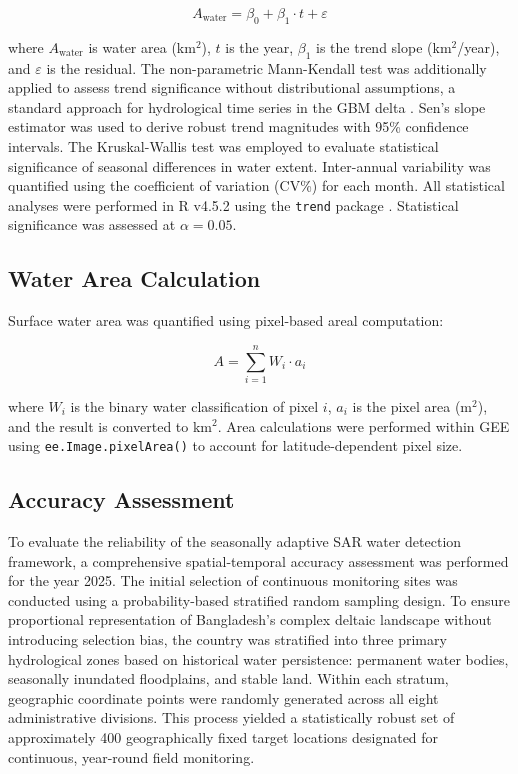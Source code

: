 \documentclass[fleqn,10pt]{article}
\begin{document}
\begin{equation}
A_{\text{water}} = \beta_0 + \beta_1 \cdot t + \varepsilon
\label{eq:trend}
\end{equation}

where $A_{\text{water}}$ is water area (km$^{2}$), $t$ is the year, $\beta_1$ is the trend slope (km$^{2}$/year), and $\varepsilon$ is the residual. The non-parametric Mann-Kendall test \cite{mann1945, kendall1975} was additionally applied to assess trend significance without distributional assumptions, a standard approach for hydrological time series in the GBM delta \cite{das2023, islam2022}. Sen's slope estimator \cite{sen1968} was used to derive robust trend magnitudes with 95\% confidence intervals. The Kruskal-Wallis test was employed to evaluate statistical significance of seasonal differences in water extent. Inter-annual variability was quantified using the coefficient of variation (CV\%) for each month. All statistical analyses were performed in R v4.5.2 using the \texttt{trend} package \cite{rcoreteam2025}. Statistical significance was assessed at $\alpha = 0.05$.

\subsection{Water Area Calculation}

Surface water area was quantified using pixel-based areal computation:

\begin{equation}
A = \sum_{i=1}^{n} W_i \cdot a_i
\label{eq:area}
\end{equation}

where $W_i$ is the binary water classification of pixel $i$, $a_i$ is the pixel area (m$^{2}$), and the result is converted to km$^{2}$. Area calculations were performed within GEE using \texttt{ee.Image.pixelArea()} to account for latitude-dependent pixel size.

\subsection{Accuracy Assessment}
\label{sec:validation}

To evaluate the reliability of the seasonally adaptive SAR water detection framework, a comprehensive spatial-temporal accuracy assessment was performed for the year 2025. The initial selection of continuous monitoring sites was conducted using a probability-based stratified random sampling design. To ensure proportional representation of Bangladesh's complex deltaic landscape without introducing selection bias, the country was stratified into three primary hydrological zones based on historical water persistence: permanent water bodies, seasonally inundated floodplains, and stable land. Within each stratum, geographic coordinate points were randomly generated across all eight administrative divisions. This process yielded a statistically robust set of approximately 400 geographically fixed target locations designated for continuous, year-round field monitoring.
\end{document}
